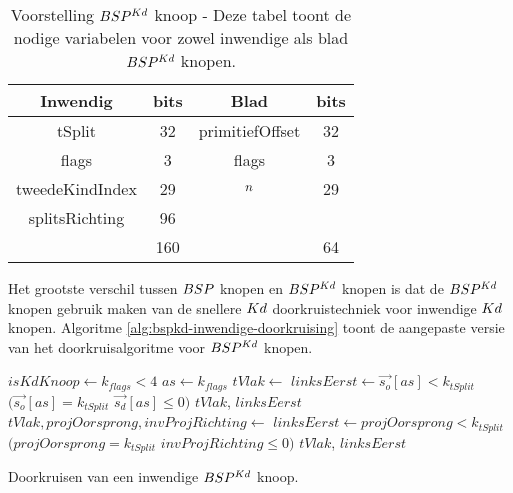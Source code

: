 \begin{table}
    \centering
    \begin{tabular}{@{}|c|c|c|c|@{}} \toprule      
        Inwendig & bits & Blad & bits \\ \midrule
        tSplit & 32 & primitiefOffset & 32 \\
        flags  & 3  &  flags   & 3   \\
        tweedeKindIndex & 29 & $n$ & 29 \\
        splitsRichting & 96 &  &  \\ \hline \hline
        & 160 & & 64    \\ \bottomrule
    \end{tabular}
\caption[Voorstelling $\symBSPKd$ knoop]{Voorstelling $\symBSPKd$ knoop - \small Deze tabel toont de nodige variabelen voor zowel inwendige als blad $\symBSPKd$ knopen.}
\label{tab:voorstelling-bspkd-knoop}
\end{table}   

Het grootste verschil tussen $BSP$ knopen en $\symBSPKd$ knopen is dat de $\symBSPKd$ knopen gebruik maken van de snellere $Kd$ doorkruistechniek voor inwendige $Kd$ knopen.
Algoritme \ref{alg:bspkd-inwendige-doorkruising} toont de aangepaste versie van het doorkruisalgoritme voor $\symBSPKd$ knopen.


\begin{dutchalgorithm}
    \begin{algorithmic}       
            \State $isKdKnoop \gets k_{flags} < 4$
                \State $as \gets k_{flags}$
                \State $tVlak \gets $ 
                \State $linksEerst \gets \vec{s_o}[as] < k_{tSplit}$ \Or $(\vec{s_o}[as] = k_{tSplit}$ \And $\vec{s_d}[as] \leq 0)$
                \State \Return $tVlak$, $linksEerst$
            \Else
                \State $tVlak, projOorsprong, invProjRichting \gets $ 
                 \State $linksEerst \gets projOorsprong < k_{tSplit}$ \Or $(projOorsprong = k_{tSplit}$ \And $invProjRichting \leq 0)$
                \State \Return $tVlak$, $linksEerst$
            \EndIf
        \EndFunction
    \end{algorithmic}
    \caption{Doorkruisen van een inwendige $\symBSPKd$ knoop.}
    \label{alg:bspkd-inwendige-doorkruising}
\end{dutchalgorithm}

